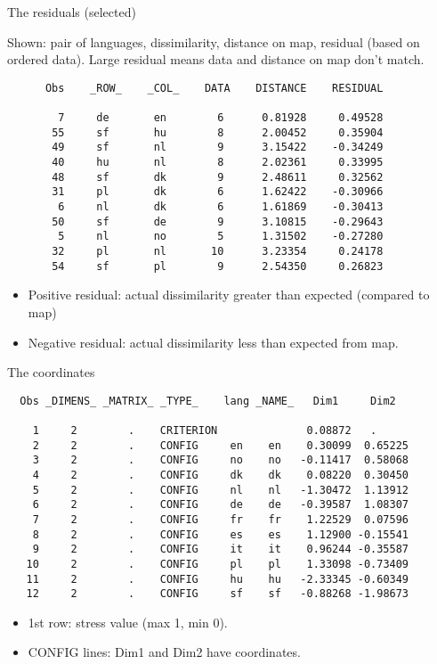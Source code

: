 \documentclass[pdf]{prosper}
\begin{document}
\begin{slide}{The residuals (selected)}

Shown: pair of languages, dissimilarity, distance on map, residual (based on ordered data). Large residual means data and distance on map don't match.
{\scriptsize
\begin{verbatim}
      Obs    _ROW_    _COL_    DATA    DISTANCE    RESIDUAL

        7     de       en        6      0.81928     0.49528
       55     sf       hu        8      2.00452     0.35904
       49     sf       nl        9      3.15422    -0.34249
       40     hu       nl        8      2.02361     0.33995
       48     sf       dk        9      2.48611     0.32562
       31     pl       dk        6      1.62422    -0.30966
        6     nl       dk        6      1.61869    -0.30413
       50     sf       de        9      3.10815    -0.29643
        5     nl       no        5      1.31502    -0.27280
       32     pl       nl       10      3.23354     0.24178
       54     sf       pl        9      2.54350     0.26823
\end{verbatim}
}

\begin{itemize}
\item Positive residual: actual dissimilarity greater than expected (compared to map)
\item Negative residual: actual dissimilarity less than expected from map.
\end{itemize}
  
\end{slide}

\begin{slide}{The coordinates}

{\scriptsize
\begin{verbatim}
  Obs _DIMENS_ _MATRIX_ _TYPE_    lang _NAME_   Dim1     Dim2

    1     2        .    CRITERION              0.08872   .
    2     2        .    CONFIG     en    en    0.30099  0.65225
    3     2        .    CONFIG     no    no   -0.11417  0.58068
    4     2        .    CONFIG     dk    dk    0.08220  0.30450
    5     2        .    CONFIG     nl    nl   -1.30472  1.13912
    6     2        .    CONFIG     de    de   -0.39587  1.08307
    7     2        .    CONFIG     fr    fr    1.22529  0.07596
    8     2        .    CONFIG     es    es    1.12900 -0.15541
    9     2        .    CONFIG     it    it    0.96244 -0.35587
   10     2        .    CONFIG     pl    pl    1.33098 -0.73409
   11     2        .    CONFIG     hu    hu   -2.33345 -0.60349
   12     2        .    CONFIG     sf    sf   -0.88268 -1.98673

\end{verbatim}
}

\begin{itemize}
\item 1st row: stress value (max 1, min 0).
\item CONFIG lines: Dim1 and Dim2 have coordinates.
\end{itemize}
  
\end{slide}
\end{document}
